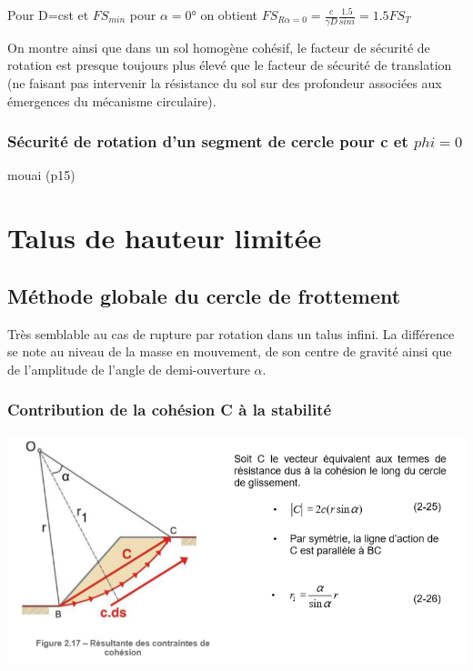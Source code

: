Pour D=cst et $FS_{min}$ pour $\alpha = 0°$ on obtient $FS_{R \alpha = 0} = \frac{c}{\gamma D} \frac{1.5}{sin i} = 1.5 FS_T$

On montre ainsi que dans un sol homogène cohésif, le facteur de sécurité de rotation est presque toujours plus élevé que le facteur de sécurité de translation (ne faisant pas intervenir la résistance du sol sur des profondeur associées aux émergences du mécanisme circulaire).

\subsubsection{Sécurité de rotation d'un segment de cercle pour c et $phi = 0$}

mouai (p15)

\section{Talus de hauteur limitée}

\subsection{Méthode globale du cercle de frottement}

Très semblable au cas de rupture par rotation dans un talus infini. La différence se note au niveau de la masse en mouvement, de son centre de gravité ainsi que de l'amplitude de l'angle de demi-ouverture $\alpha$.

\subsubsection{Contribution de la cohésion C à la stabilité}

\begin{center}
\includegraphics [scale=0.8]{pictures/t.PNG}
\end{center}

